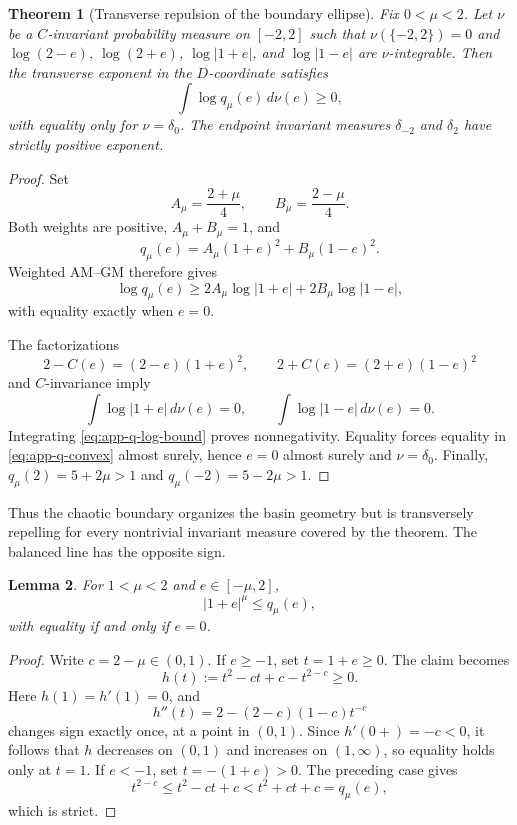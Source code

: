 \documentclass[11pt]{article}
\newtheorem{theorem}{Theorem}
\newtheorem{lemma}[theorem]{Lemma}
\begin{document}
\begin{theorem}[Transverse repulsion of the boundary ellipse]
\label{thm:det-ellipse-transverse}
Fix \(0<\mu<2\).  Let \(\nu\) be a \(C\)-invariant probability measure
on \([-2,2]\) such that \(\nu(\{-2,2\})=0\) and
\(\log(2-e)\), \(\log(2+e)\), \(\log|1+e|\), and
\(\log|1-e|\) are \(\nu\)-integrable.  Then the transverse exponent in
the \(D\)-coordinate satisfies
\[
    \int\log q_\mu(e)\,d\nu(e)\ge 0,
\]
with equality only for \(\nu=\delta_0\).  The endpoint invariant measures
\(\delta_{-2}\) and \(\delta_2\) have strictly positive exponent.
\end{theorem}

\begin{proof}
Set
\[
    A_\mu=\frac{2+\mu}{4},
    \qquad
    B_\mu=\frac{2-\mu}{4}.
\]
Both weights are positive, \(A_\mu+B_\mu=1\), and
\begin{equation}
\label{eq:app-q-convex}
    q_\mu(e)
    =A_\mu(1+e)^2+B_\mu(1-e)^2.
\end{equation}
Weighted AM--GM therefore gives
\begin{equation}
\label{eq:app-q-log-bound}
    \log q_\mu(e)
    \ge
    2A_\mu\log|1+e|+2B_\mu\log|1-e|,
\end{equation}
with equality exactly when \(e=0\).

The factorizations
\[
    2-C(e)=(2-e)(1+e)^2,
    \qquad
    2+C(e)=(2+e)(1-e)^2
\]
and \(C\)-invariance imply
\[
    \int\log|1+e|\,d\nu(e)=0,
    \qquad
    \int\log|1-e|\,d\nu(e)=0.
\]
Integrating \eqref{eq:app-q-log-bound} proves nonnegativity.  Equality
forces equality in \eqref{eq:app-q-convex} almost surely, hence
\(e=0\) almost surely and \(\nu=\delta_0\).  Finally,
\(q_\mu(2)=5+2\mu>1\) and \(q_\mu(-2)=5-2\mu>1\).
\end{proof}

Thus the chaotic boundary organizes the basin geometry but is transversely
repelling for every nontrivial invariant measure covered by the theorem.
The balanced line has the opposite sign.

\begin{lemma}
\label{lem:det-balanced-inequality}
For \(1<\mu<2\) and \(e\in[-\mu,2]\),
\[
    |1+e|^\mu\le q_\mu(e),
\]
with equality if and only if \(e=0\).
\end{lemma}

\begin{proof}
Write \(c=2-\mu\in(0,1)\).  If \(e\ge-1\), set \(t=1+e\ge0\).  The
claim becomes
\[
    h(t):=t^2-ct+c-t^{2-c}\ge0.
\]
Here \(h(1)=h'(1)=0\), and
\[
    h''(t)=2-(2-c)(1-c)t^{-c}
\]
changes sign exactly once, at a point in \((0,1)\).  Since
\(h'(0+)=-c<0\), it follows that \(h\) decreases on \((0,1)\) and
increases on \((1,\infty)\), so equality holds only at \(t=1\).
If \(e<-1\), set \(t=-(1+e)>0\).  The preceding case gives
\[
    t^{2-c}\le t^2-ct+c<t^2+ct+c=q_\mu(e),
\]
which is strict.
\end{proof}
\end{document}
